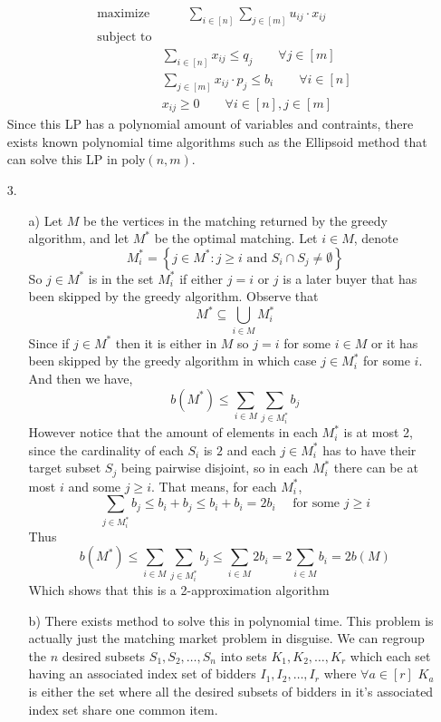 \documentclass[12pt]{article}
\newcommand\set[1]{\left\lbrace #1 \right\rbrace}
\begin{document}
\begin{itemize}
\begin{align*}
	\text{maximize}& \qquad   \sum_{i \in [n]} \sum\limits_{j \in [m]} u_{ij}\cdot x_{ij}\\
	\text{subject to}\\
								 &  \displaystyle \sum\limits_{i \in [n]} x_{ij} \leq q_j  \qquad  \forall j \in [m]\\
							& \displaystyle \sum\limits_{j \in [m]} x_{ij}\cdot p_j \leq b_i \qquad  \forall i \in [n] \\
							& x_{ij} \geq 0 \qquad  \forall i \in [n], j\in [m]
\end{align*}
Since this LP has a polynomial amount of variables and contraints, there exists known polynomial time algorithms such as the Ellipsoid method that can solve this LP in $\text{poly}(n,m)$. 
	
\item[3.]
	\begin{itemize}
		\item[a)] Let $M$ be the vertices in the matching returned by the greedy algorithm, and let $M^*$ be the optimal matching. Let $i \in M$, denote 
		\[M^*_i = \set{j \in M^* \colon j \geq i \text{ and } S_i \cap S_j \neq \emptyset}\]
		So $j \in M^*$ is in the set $M^*_i$ if either $j=i$ or $j$ is a later buyer that has been skipped by the greedy algorithm. 
		Observe that 
		\[
M^* \subseteq \bigcup_{i \in M} M^*_i
		\]
		Since if $j \in M^*$ then it is either in $M$ so $j=i$ for some $i \in M$ or it has been skipped by the greedy algorithm in which case $j \in M^*_i$ for some $i$. And then we have, 
		\[
			b(M^*) \leq \sum_{i \in M} \sum_{j \in M^*_i} b_j
		\]
		However notice that the amount of elements in each $M_i^*$ is at most 2, since the cardinality of each $S_i$ is $2$ and each $j \in M^*_i$ has to have their target subset $S_j$ being pairwise disjoint, so in each $M^*_i$ there can be at most $i$ and some $j \geq i $. That means, for each $M^*_i$, 
		\[
			\sum_{j \in M^*_i} b_j \leq b_i + b_j \leq b_i + b_i = 2b_i \quad \text{ for some $j \geq i$} 
		\]
		Thus 
		\[
			b(M^*) \leq \sum_{i \in M} \sum_{j \in M^*_i} b_j \leq \sum_{i \in M} 2b_i = 2 \sum_{i \in M} b_i = 2 b(M)
		\]
		Which shows that this is a 2-approximation algorithm
		\item[b)] There exists method to solve this in polynomial time. This problem is actually just the matching market problem in disguise. We can regroup the $n$ desired subsets $S_1, S_2, \ldots, S_n$ into sets $K_1, K_2, \ldots, K_r$ which each set having an associated index set of bidders $I_1, I_2, \ldots, I_r$ where $\forall a \in [r]$  $K_a$ is either the set where all the desired subsets of bidders in it's associated index set share one common item. 

\end{itemize}
\end{itemize}
\end{document}
